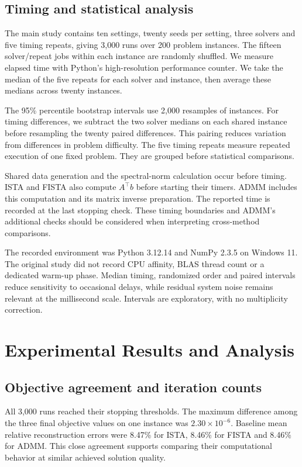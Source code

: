 \documentclass{article}
\begin{document}
\subsection{Timing and statistical analysis}
The main study contains ten settings, twenty seeds per setting, three solvers and five timing repeats, giving 3,000 runs over 200 problem instances. The fifteen solver/repeat jobs within each instance are randomly shuffled. We measure elapsed time with Python's high-resolution performance counter. We take the median of the five repeats for each solver and instance, then average these medians across twenty instances.

The 95\% percentile bootstrap intervals use 2,000 resamples of instances. For timing differences, we subtract the two solver medians on each shared instance before resampling the twenty paired differences. This pairing reduces variation from differences in problem difficulty. The five timing repeats measure repeated execution of one fixed problem. They are grouped before statistical comparisons.

Shared data generation and the spectral-norm calculation occur before timing. ISTA and FISTA also compute $A^\top b$ before starting their timers. ADMM includes this computation and its matrix inverse preparation. The reported time is recorded at the last stopping check. These timing boundaries and ADMM's additional checks should be considered when interpreting cross-method comparisons.

The recorded environment was Python 3.12.14 and NumPy 2.3.5 on Windows 11. The original study did not record CPU affinity, BLAS thread count or a dedicated warm-up phase. Median timing, randomized order and paired intervals reduce sensitivity to occasional delays, while residual system noise remains relevant at the millisecond scale. Intervals are exploratory, with no multiplicity correction.

\section{Experimental Results and Analysis}
\subsection{Objective agreement and iteration counts}
All 3,000 runs reached their stopping thresholds. The maximum difference among the three final objective values on one instance was $2.30\times10^{-6}$. Baseline mean relative reconstruction errors were 8.47\% for ISTA, 8.46\% for FISTA and 8.46\% for ADMM. This close agreement supports comparing their computational behavior at similar achieved solution quality.
\end{document}
